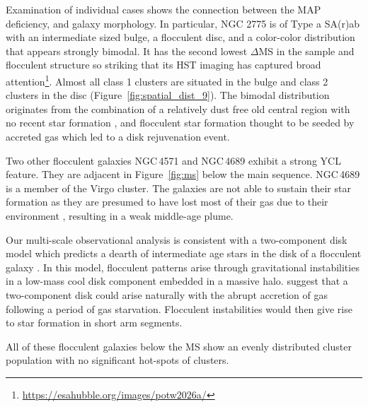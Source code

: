 \documentclass[linenumbers]{aastex63}
\begin{document}
Examination of individual cases shows the connection between the MAP deficiency, and galaxy morphology. %
In particular, NGC 2775 is of Type a SA(r)ab with an intermediate sized bulge, a flocculent disc, and a color-color distribution that appears strongly bimodal.  It has the second lowest $\Delta$MS in the sample and flocculent structure so striking that its HST imaging has captured broad attention\footnote{\url{https://esahubble.org/images/potw2026a/}}. %
Almost all class 1 clusters are situated in the bulge and class 2 clusters in the disc (Figure~\ref{fig:spatial_dist_9}). The bimodal distribution originates from the combination of a relatively dust free old central region with no recent star formation \citep{hogg_hot_2001}, and flocculent star formation thought to be seeded by accreted gas \citep[i.e., from the nearby companion NGC\,2777,][]{arp_properties_1991} which led to a disk rejuvenation event. 

Two other flocculent galaxies NGC\,4571 \citep{kennicutt_evolution_1983} and NGC\,4689 \citep{elmegreen_arm_2002} exhibit a strong YCL feature. They are adjacent in Figure~\ref{fig:ms} below the main sequence.  NGC\,4689 is a member of the Virgo cluster. The galaxies are not able to sustain their star formation as they are presumed to have lost most of their gas due to their environment \citep{kenney_co_1986}, resulting in a weak middle-age plume.

Our multi-scale observational analysis is consistent with a two-component disk model which predicts a dearth of intermediate age stars in the disk of a flocculent galaxy \citep{ET93,SM22}.  In this model, flocculent patterns arise through gravitational instabilities in a low-mass cool disk component embedded in a massive halo. \citet{SM22} suggest that a two-component disk could arise naturally with the abrupt accretion of gas following a period of gas starvation. Flocculent instabilities would then give rise to star formation in short arm segments. 


All of these flocculent galaxies below the MS show an evenly distributed cluster population with no significant hot-spots of clusters. 
\end{document}
